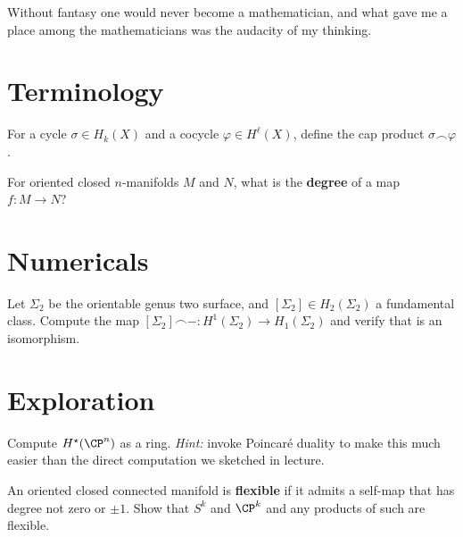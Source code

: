 \documentclass{homework}
\author{Jim Fowler}
\begin{document}
\maketitle

\begin{inspiration} Without fantasy one would never become a
mathematician, and what gave me a place among the mathematicians was
the audacity of my thinking. 
\end{inspiration}

\section{Terminology}

\begin{problem} For a cycle $\sigma \in H_k(X)$ and a cocycle $\varphi \in H^\ell(X)$, define the cap product $\sigma \smallfrown \varphi$.
\end{problem}

\begin{problem} For oriented closed $n$-manifolds $M$ and $N$, what is
the \textbf{degree} of a map $f : M \to N$?
\end{problem}

\section{Numericals}

\begin{problem} Let $\Sigma_2$ be the orientable genus two surface,
and $[\Sigma_2] \in H_2(\Sigma_2)$ a fundamental class. Compute the
map $[\Sigma_2] \smallfrown - : H^1(\Sigma_2) \to H_1(\Sigma_2)$ and
verify that is an isomorphism.
\end{problem}

\section{Exploration}

\begin{problem} Compute $H^\star(\CP^n)$ as a ring.  \textit{Hint:}
invoke Poincar\'e duality to make this much easier than the direct
computation we sketched in lecture.
\end{problem}

\begin{problem} An oriented closed connected manifold is
\textbf{flexible} if it admits a self-map that has degree not zero or
$\pm 1$.  Show that $S^k$ and $\CP^k$ and any products of such are
flexible.
\end{problem}
\end{document}
